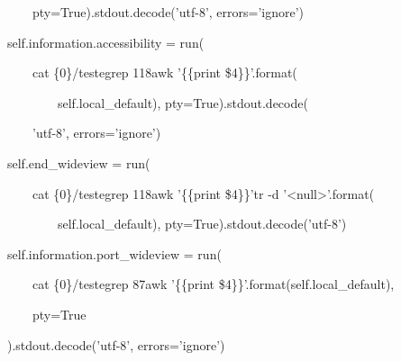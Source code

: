            {\ttfamily\color[rgb]{0.10980392,0.10980392,0.10980392}
            \ \ \ \ \ \ \ \ \ \ \ \ pty=True).stdout.decode('utf-8', errors='ignore')}


    \bigskip

{\ttfamily\color[rgb]{0.10980392,0.10980392,0.10980392}
    \ \ \ \ \ \ \ \ self.information.accessibility = run(}

            {\ttfamily\color[rgb]{0.10980392,0.10980392,0.10980392}
            \ \ \ \ \ \ \ \ \ \ \ \ {\textquotedbl}cat \{0\}/teste{\textbar}grep 118{\textbar}awk '\{\{print
            \$4\}\}'{\textquotedbl}.format(}

                    {\ttfamily\color[rgb]{0.10980392,0.10980392,0.10980392}
                    \ \ \ \ \ \ \ \ \ \ \ \ \ \ \ \ self.local\_default), pty=True).stdout.decode(}

                    {\ttfamily\color[rgb]{0.10980392,0.10980392,0.10980392}
                    \ \ \ \ \ \ \ \ \ \ \ \ {}'utf-8', errors='ignore')}


                    \bigskip

{\ttfamily\color[rgb]{0.10980392,0.10980392,0.10980392}
    \ \ \ \ \ \ \ \ self.end\_wideview = run(}

            {\ttfamily\color[rgb]{0.10980392,0.10980392,0.10980392}
            \ \ \ \ \ \ \ \ \ \ \ \ {\textquotedbl}cat \{0\}/teste{\textbar}grep 118{\textbar}awk '\{\{print \$4\}\}'{\textbar}tr -d
            '{\textless}null{\textgreater}'{\textquotedbl}.format(}

                    {\ttfamily\color[rgb]{0.10980392,0.10980392,0.10980392}
                    \ \ \ \ \ \ \ \ \ \ \ \ \ \ \ \ self.local\_default), pty=True).stdout.decode('utf-8')}


    \bigskip

{\ttfamily\color[rgb]{0.10980392,0.10980392,0.10980392}
    \ \ \ \ \ \ \ \ self.information.port\_wideview = run(}

            {\ttfamily\color[rgb]{0.10980392,0.10980392,0.10980392}
            \ \ \ \ \ \ \ \ \ \ \ \ {\textquotedbl}cat \{0\}/teste{\textbar}grep 87{\textbar}awk '\{\{print
            \$4\}\}'{\textquotedbl}.format(self.local\_default),}

            {\ttfamily\color[rgb]{0.10980392,0.10980392,0.10980392}
            \ \ \ \ \ \ \ \ \ \ \ \ pty=True}

            {\ttfamily\color[rgb]{0.10980392,0.10980392,0.10980392}
            \ \ \ \ \ \ \ \ ).stdout.decode('utf-8', errors='ignore')}


